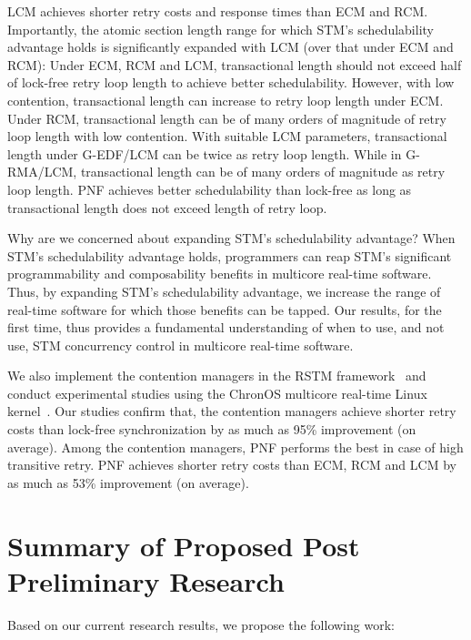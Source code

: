 LCM achieves shorter retry costs and response times than ECM and RCM. Importantly, the atomic section length range for which STM's schedulability advantage holds is significantly expanded with LCM (over that under ECM and RCM): Under ECM, RCM and LCM, transactional length should not exceed half of lock-free retry loop length to achieve better schedulability. However, with low contention, transactional length can increase to retry loop length under ECM. Under RCM, transactional length can be of many orders of magnitude of retry loop length with low contention. With suitable LCM parameters, transactional length under G-EDF/LCM can be twice as retry loop length. While in G-RMA/LCM, transactional length can be of many orders of magnitude as retry loop length. PNF achieves better schedulability than lock-free as long as transactional length does not exceed length of retry loop.

Why are we concerned about expanding STM's schedulability advantage? When STM's schedulability advantage holds, programmers can reap STM's significant programmability and composability benefits in multicore real-time software. Thus, by expanding STM's schedulability advantage, we increase the range of real-time software for which those benefits can be tapped. Our results, for the first time, thus provides a fundamental understanding of when to use, and not use, STM concurrency control in multicore real-time software.

We also implement the contention managers in the RSTM framework~\cite{Shriraman:2007:IHA:1250662.1250676} and conduct experimental studies using the ChronOS multicore real-time Linux kernel~\cite{dellinger2011chronos}. Our studies confirm that, the contention managers achieve shorter retry costs than lock-free synchronization by as much as 95\% improvement (on average). Among the contention managers, PNF performs the best in case of high transitive retry. PNF achieves shorter retry costs than ECM, RCM and LCM by as much as 53\% improvement (on average).

\section{\label{sec:postprelim work}Summary of Proposed Post Preliminary Research}

Based on our current research results, we propose the following work:

